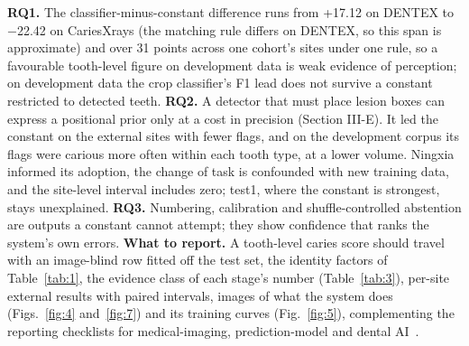 \documentclass[conference]{IEEEtran}
\begin{document}
\textbf{RQ1.} The classifier-minus-constant difference runs from +17.12 on DENTEX to $-$22.42 on CariesXrays (the matching rule differs on DENTEX, so this span is approximate) and over 31 points across one cohort's sites under one rule, so a favourable tooth-level figure on development data is weak evidence of perception; on development data the crop classifier's F1 lead does not survive a constant restricted to detected teeth. \textbf{RQ2.} A detector that must place lesion boxes can express a positional prior only at a cost in precision (Section III-E). It led the constant on the external sites with fewer flags, and on the development corpus its flags were carious more often within each tooth type, at a lower volume. Ningxia informed its adoption, the change of task is confounded with new training data, and the site-level interval includes zero; test1, where the constant is strongest, stays unexplained. \textbf{RQ3.} Numbering, calibration and shuffle-controlled abstention are outputs a constant cannot attempt; they show confidence that ranks the system's own errors. \textbf{What to report.} A tooth-level caries score should travel with an image-blind row fitted off the test set, the identity factors of Table~\ref{tab:1}, the evidence class of each stage's number (Table~\ref{tab:3}), per-site external results with paired intervals, images of what the system does (Figs.~\ref{fig:4} and~\ref{fig:7}) and its training curves (Fig.~\ref{fig:5}), complementing the reporting checklists for medical-imaging, prediction-model and dental AI~\cite{mongan2020claim,collins2024tripod,schwendicke2021checklist}.
\end{document}
